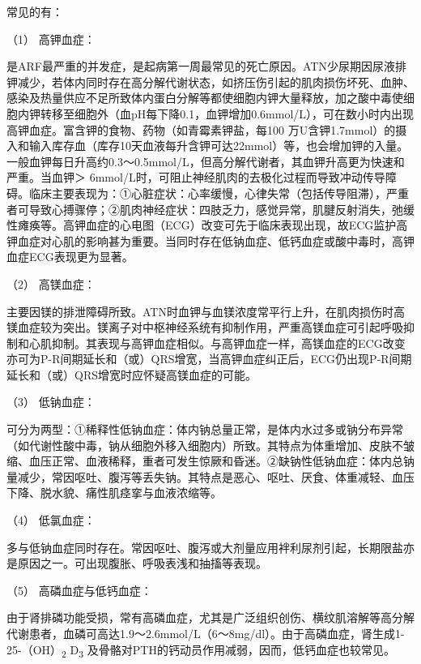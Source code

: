 常见的有：

\hypertarget{text00083.htmlux5cux23CHP3-7-5-2-2-3-1}{}
（1） 高钾血症：

是ARF最严重的并发症，是起病第一周最常见的死亡原因。ATN少尿期因尿液排钾减少，若体内同时存在高分解代谢状态，如挤压伤引起的肌肉损伤坏死、血肿、感染及热量供应不足所致体内蛋白分解等都使细胞内钾大量释放，加之酸中毒使细胞内钾转移至细胞外（血pH每下降0.1，血钾增加0.6mmol/L），可在数小时内出现高钾血症。富含钾的食物、药物（如青霉素钾盐，每100
万U含钾1.7mmol）的摄入和输入库存血（库存10天血液每升含钾可达22mmol）等，也会增加钾的入量。一般血钾每日升高约0.3～0.5mmol/L，但高分解代谢者，其血钾升高更为快速和严重。当血钾＞
6mmol/L时，可阻止神经肌肉的去极化过程而导致冲动传导障碍。临床主要表现为：①心脏症状：心率缓慢，心律失常（包括传导阻滞），严重者可导致心搏骤停；②肌肉神经症状：四肢乏力，感觉异常，肌腱反射消失，弛缓性瘫痪等。高钾血症的心电图（ECG）改变可先于临床表现出现，故ECG监护高钾血症对心肌的影响甚为重要。当同时存在低钠血症、低钙血症或酸中毒时，高钾血症ECG表现更为显著。

\hypertarget{text00083.htmlux5cux23CHP3-7-5-2-2-3-2}{}
（2） 高镁血症：

主要因镁的排泄障碍所致。ATN时血钾与血镁浓度常平行上升，在肌肉损伤时高镁血症较为突出。镁离子对中枢神经系统有抑制作用，严重高镁血症可引起呼吸抑制和心肌抑制。其表现与高钾血症相似。与高钾血症一样，高镁血症的ECG改变亦可为P-R间期延长和（或）QRS增宽，当高钾血症纠正后，ECG仍出现P-R间期延长和（或）QRS增宽时应怀疑高镁血症的可能。

\hypertarget{text00083.htmlux5cux23CHP3-7-5-2-2-3-3}{}
（3） 低钠血症：

可分为两型：①稀释性低钠血症：体内钠总量正常，是体内水过多或钠分布异常（如代谢性酸中毒，钠从细胞外移入细胞内）所致。其特点为体重增加、皮肤不皱缩、血压正常、血液稀释，重者可发生惊厥和昏迷。②缺钠性低钠血症：体内总钠量减少，常因呕吐、腹泻等丢失钠。其特点是恶心、呕吐、厌食、体重减轻、血压下降、脱水貌、痛性肌痉挛与血液浓缩等。

\hypertarget{text00083.htmlux5cux23CHP3-7-5-2-2-3-4}{}
（4） 低氯血症：

多与低钠血症同时存在。常因呕吐、腹泻或大剂量应用袢利尿剂引起，长期限盐亦是原因之一。可出现腹胀、呼吸表浅和抽搐等表现。

\hypertarget{text00083.htmlux5cux23CHP3-7-5-2-2-3-5}{}
（5） 高磷血症与低钙血症：

由于肾排磷功能受损，常有高磷血症，尤其是广泛组织创伤、横纹肌溶解等高分解代谢患者，血磷可高达1.9～2.6mmol/L（6～8mg/dl）。由于高磷血症，肾生成1-25-（OH）\textsubscript{2}
D\textsubscript{3} 及骨骼对PTH的钙动员作用减弱，因而，低钙血症也较常见。

